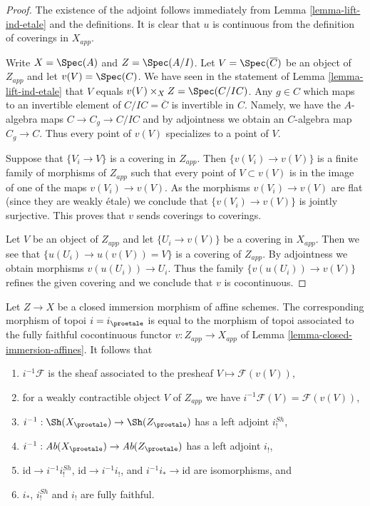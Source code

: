 \begin{proof}
The existence of the adjoint follows immediately from
Lemma \ref{lemma-lift-ind-etale} and the definitions.
It is clear that $u$ is continuous from the definition of
coverings in $X_{app}$.

\medskip\noindent
Write $X = \Spec(A)$ and $Z = \Spec(A/I)$. Let $V = \Spec(\overline{C})$
be an object of $Z_{app}$ and let $v(V) = \Spec(C)$.
We have seen in the statement of Lemma \ref{lemma-lift-ind-etale}
that $V$ equals $v(V) \times_X Z = \Spec(C/IC)$.
Any $g \in C$ which maps to an invertible element of
$C/IC = \overline{C}$ is invertible in $C$. Namely, we have the
$A$-algebra maps $C \to C_g \to C/IC$ and by adjointness
we obtain an $C$-algebra map $C_g \to C$.
Thus every point of $v(V)$ specializes to a point of $V$.

\medskip\noindent
Suppose that $\{V_i \to V\}$ is a covering in $Z_{app}$.
Then $\{v(V_i) \to v(V)\}$ is a finite family of morphisms of
$Z_{app}$ such that every point of $V \subset v(V)$ is
in the image of one of the maps $v(V_i) \to v(V)$. As the
morphisms $v(V_i) \to v(V)$ are flat (since they are weakly \'etale)
we conclude that $\{v(V_i) \to v(V)\}$ is jointly surjective.
This proves that $v$ sends coverings to coverings.

\medskip\noindent
Let $V$ be an object of $Z_{app}$ and let $\{U_i \to v(V)\}$
be a covering in $X_{app}$. Then we see that
$\{u(U_i) \to u(v(V)) = V\}$ is a covering of $Z_{app}$.
By adjointness we obtain morphisms $v(u(U_i)) \to U_i$.
Thus the family $\{v(u(U_i)) \to v(V)\}$ refines the given
covering and we conclude that $v$ is cocontinuous.
\end{proof}

\begin{lemma}
\label{lemma-closed-immersion-affines-apply}
Let $Z \to X$ be a closed immersion morphism of affine schemes.
The corresponding morphism of topoi $i = i_\proetale$
is equal to the morphism of topoi
associated to the fully faithful cocontinuous functor
$v : Z_{app} \to X_{app}$ of Lemma \ref{lemma-closed-immersion-affines}.
It follows that
\begin{enumerate}
\item $i^{-1}\mathcal{F}$ is the sheaf associated to the presheaf
$V \mapsto \mathcal{F}(v(V))$,
\item for a weakly contractible object $V$ of $Z_{app}$ we have
$i^{-1}\mathcal{F}(V) = \mathcal{F}(v(V))$,
\item $i^{-1} : \Sh(X_\proetale) \to \Sh(Z_\proetale)$
has a left adjoint $i^{Sh}_!$,
\item $i^{-1} : \textit{Ab}(X_\proetale) \to \textit{Ab}(Z_\proetale)$
has a left adjoint $i_!$,
\item $\text{id} \to i^{-1}i^{Sh}_!$, $\text{id} \to i^{-1}i_!$, and
$i^{-1}i_* \to \text{id}$ are isomorphisms, and
\item $i_*$, $i^{Sh}_!$ and $i_!$ are fully faithful.
\end{enumerate}
\end{lemma}

